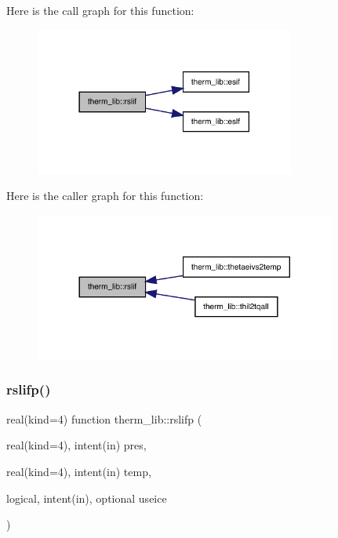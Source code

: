 Here is the call graph for this function\+:
\nopagebreak
\begin{figure}[H]
\begin{center}
\leavevmode
\includegraphics[width=242pt]{namespacetherm__lib_acc637bbfa1fdd9b523e2b1cf3dce2926_cgraph}
\end{center}
\end{figure}
Here is the caller graph for this function\+:
\nopagebreak
\begin{figure}[H]
\begin{center}
\leavevmode
\includegraphics[width=281pt]{namespacetherm__lib_acc637bbfa1fdd9b523e2b1cf3dce2926_icgraph}
\end{center}
\end{figure}
\mbox{\label{namespacetherm__lib_a3ba8735d59b87e78d614f76ed778b639}} 
\subsubsection{\texorpdfstring{rslifp()}{rslifp()}}
{\footnotesize\ttfamily real(kind=4) function therm\+\_\+lib\+::rslifp (\begin{DoxyParamCaption}\item[{real(kind=4), intent(in)}]{pres,  }\item[{real(kind=4), intent(in)}]{temp,  }\item[{logical, intent(in), optional}]{useice }\end{DoxyParamCaption})}


